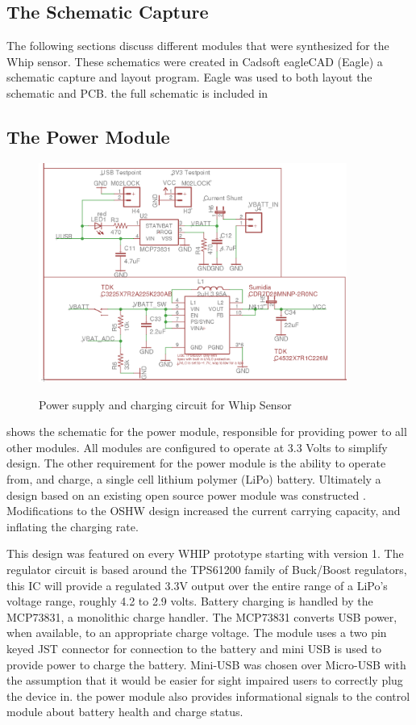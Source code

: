 \subsection {The Schematic Capture}

The following sections discuss different modules that were synthesized for the Whip sensor. These schematics were created in Cadsoft eagleCAD (Eagle) a schematic capture and layout program. Eagle was used to both layout the schematic and PCB. the full schematic is included in 


\subsection {The Power Module}
\begin{figure}
	\begin{center}
		\label{fig:Rev5_power}
		\includegraphics[scale=1,width=0.9\textwidth]{Images/Rev5_PowerSch.png} 
		\caption{Power supply and charging circuit for Whip Sensor}
	\end{center}
\end{figure}
 shows the schematic for the power module, responsible for providing power to all other modules. All modules are configured to operate at 3.3 Volts to simplify design. The other requirement for the power module is the ability to operate from, and charge, a single cell lithium polymer (LiPo) battery. Ultimately a design based on an existing open source power module was constructed \cite{Sparkfun2012}. Modifications to the OSHW design increased the current carrying capacity, and inflating the charging rate.

This design was featured on every WHIP prototype starting with version 1. The regulator circuit is based around the TPS61200 family of Buck/Boost regulators, this IC will provide a regulated 3.3V output over the entire range of a LiPo's voltage range, roughly 4.2 to 2.9 volts. Battery charging is handled by the MCP73831, a monolithic charge handler. The MCP73831 converts USB power, when available, to an appropriate charge voltage. The module uses a two pin keyed JST connector for connection to the battery and mini USB is used to provide power to charge the battery. Mini-USB was chosen over Micro-USB with the assumption that it would be easier for sight impaired users to correctly plug the device in. the power module also provides informational signals to the control module about battery health and charge status.

